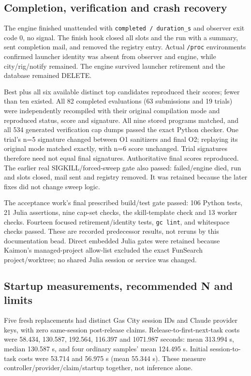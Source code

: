 \documentclass[11pt]{article}
\newcommand{\code}[1]{\texttt{#1}}
\begin{document}
\subsection{Completion, verification and crash recovery}
The engine finished unattended with \code{completed / duration\_s} and observer
exit code 0, no signal. The finish hook closed all slots and the run with a
summary, sent completion mail, and removed the registry entry. Actual
\code{/proc} environments confirmed launcher identity was absent from observer
and engine, while city/rig/notify remained. The engine survived launcher
retirement and the database remained DELETE.

Best plus all six available distinct top candidates reproduced their scores;
fewer than ten existed. All 82 completed evaluations (63 submissions and
19 trials) were independently recompiled with their original compilation mode
and reproduced status, score and signature. All nine stored programs matched,
and all 534 generated verification cap dumps passed the exact Python checker.
One trial's n=5 signature changed between O1 sanitizers and final O2; replaying
its original mode matched exactly, with n=6 score unchanged. Trial signatures
therefore need not equal final signatures. Authoritative final scores reproduced.
The earlier real SIGKILL/forced-sweep gate also passed: failed/engine died,
run and slots closed, mail sent and registry removed. It was retained because
the later fixes did not change sweep logic.

The acceptance work's final prescribed build/test gate passed: 106 Python tests,
21 Julia assertions, nine cap-set checks, the skill-template check and 13 worker
checks. Fourteen focused retirement/identity tests, \code{gc lint}, and whitespace
checks passed. These are recorded predecessor results, not reruns by this
documentation bead. Direct embedded Julia gates were retained because Kaimon's
managed-project allow-list excluded the exact FunSearch project/worktree;
no shared Julia session or service was changed.

\subsection{Startup measurements, recommended N and limits}
Five fresh replacements had distinct Gas City session IDs and Claude provider
keys, with zero same-session post-release claims. Release-to-first-next-task
costs were 58.434, 130.587, 192.564, 116.397 and 1071.987 seconds:
mean 313.994 s, median 130.587 s, and four ordinary samples' mean 124.495 s.
Initial session-to-task costs were 53.714 and 56.975 s (mean 55.344 s).
These measure controller/provider/claim/startup together, not inference alone.
\end{document}
